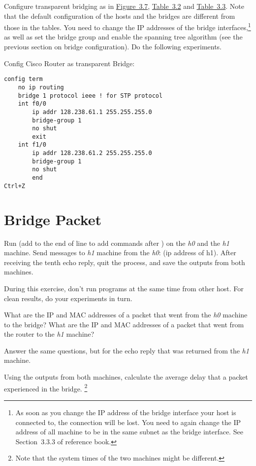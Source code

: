 \documentclass{../UTNetLab}
\begin{document}
Configure transparent bridging as in \hyperref[fig:3.7]{Figure~3.7}, \hyperref[tab:3.2]{Table~3.2} and \hyperref[tab:3.3]{Table~3.3}.
Note that the default configuration of the hosts and the bridges are different from those in the tables.
You need to change the IP addresses of the bridge interfaces,\footnote{As soon as you change the IP address of the bridge interface your host is connected to, the  connection will be lost.
    You need to again change the IP address of all machine to be in the same subnet as the bridge interface.
    See Section~3.3.3  of reference book.} as well as set the bridge group and enable the spanning tree algorithm (see the previous section on bridge configuration).
Do the following experiments.

Config Cisco Router as transparent Bridge:
\begin{lstlisting}[language={cisco}]
config term
    no ip routing
    bridge 1 protocol ieee ! for STP protocol
    int f0/0
        ip addr 128.238.61.1 255.255.255.0
        bridge-group 1
        no shut
        exit
    int f1/0
        ip addr 128.238.61.2 255.255.255.0
        bridge-group 1
        no shut
        end
Ctrl+Z
    \end{lstlisting}

\section{Bridge Packet}
Run  (add \lstbash{&} to the end of line to add commands after ) on the \textit{h0} and the \textit{h1} machine.
Send  messages to \textit{h1} machine from the \textit{h0}:  (ip address of h1).
After receiving the tenth echo reply, quit the  process, and save the  outputs from both machines.

During this exercise, don’t run  programs at the same time from other host.
For clean results, do your experiments in turn.

\begin{report}
    \item What are the IP and MAC addresses of a packet that went from the \textit{h0} machine to the bridge?
    What are the IP and MAC addresses of a packet that went from the router to the \textit{h1} machine?

    \item Answer the same questions, but for the echo reply that was returned from the \textit{h1} machine.

    \item Using the  outputs from both machines, calculate the average delay that a packet experienced in the bridge.
    \footnote{Note that the system times of the two machines might be different.}
\end{report}
\end{document}
